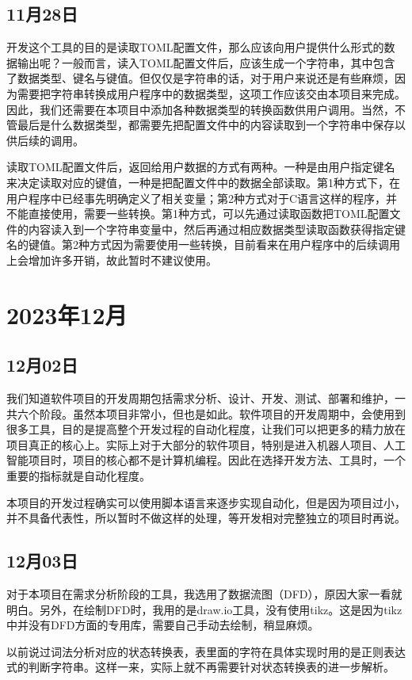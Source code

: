 \subsection{11月28日}
开发这个工具的目的是读取TOML配置文件，那么应该向用户提供什么形式的数据输出呢？一般而言，读入TOML配置文件后，应该生成一个字符串，其中包含了数据类型、键名与键值。但仅仅是字符串的话，对于用户来说还是有些麻烦，因为需要把字符串转换成用户程序中的数据类型，这项工作应该交由本项目来完成。因此，我们还需要在本项目中添加各种数据类型的转换函数供用户调用。当然，不管最后是什么数据类型，都需要先把配置文件中的内容读取到一个字符串中保存以供后续的调用。

读取TOML配置文件后，返回给用户数据的方式有两种。一种是由用户指定键名来决定读取对应的键值，一种是把配置文件中的数据全部读取。第1种方式下，在用户程序中已经事先明确定义了相关变量；第2种方式对于C语言这样的程序，并不能直接使用，需要一些转换。第1种方式，可以先通过读取函数把TOML配置文件的内容读入到一个字符串变量中，然后再通过相应数据类型读取函数获得指定键名的键值。第2种方式因为需要使用一些转换，目前看来在用户程序中的后续调用上会增加许多开销，故此暂时不建议使用。


\section{2023年12月}


\subsection{12月02日}
我们知道软件项目的开发周期包括需求分析、设计、开发、测试、部署和维护，一共六个阶段。虽然本项目非常小，但也是如此。软件项目的开发周期中，会使用到很多工具，目的是提高整个开发过程的自动化程度，让我们可以把更多的精力放在项目真正的核心上。实际上对于大部分的软件项目，特别是进入机器人项目、人工智能项目时，项目的核心都不是计算机编程。因此在选择开发方法、工具时，一个重要的指标就是自动化程度。

本项目的开发过程确实可以使用脚本语言来逐步实现自动化，但是因为项目过小，并不具备代表性，所以暂时不做这样的处理，等开发相对完整独立的项目时再说。


\subsection{12月03日}
对于本项目在需求分析阶段的工具，我选用了数据流图（DFD），原因大家一看就明白。另外，在绘制DFD时，我用的是draw.io工具，没有使用tikz。这是因为tikz中并没有DFD方面的专用库，需要自己手动去绘制，稍显麻烦。

以前说过词法分析对应的状态转换表，表里面的字符在具体实现时用的是正则表达式的判断字符串。这样一来，实际上就不再需要针对状态转换表的进一步解析。